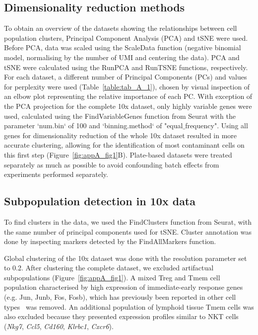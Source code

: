 \subsection{Dimensionality reduction methods}
To obtain an overview of the datasets showing the relationships between cell population clusters, Principal Component Analysis (PCA) and tSNE were used. Before PCA, data was scaled using the ScaleData function (negative binomial model, normalising by the number of UMI and centering the data). PCA and tSNE were calculated using the RunPCA and RunTSNE functions, respectively. For each dataset, a different number of Principal Components (PCs) and values for perplexity were used (Table~\ref{table:tab_A_1}), chosen by visual inspection of an elbow plot representing the relative importance of each PC. With exception of the PCA projection for the complete 10x dataset, only highly variable genes were used, calculated using the FindVariableGenes function from Seurat with the parameter `num.bin` of 100 and `binning.method` of "equal${\_}$frequency". Using all genes for dimensionality reduction of the whole 10x dataset resulted in more accurate clustering, allowing for the identification of most contaminant cells on this first step (Figure~\ref{fig:appA_fig1}B). Plate-based datasets were treated separately as much as possible to avoid confounding batch effects from experiments performed separately.


\subsection{Subpopulation detection in 10x data}
To find clusters in the data, we used the FindClusters function from Seurat, with the same number of principal components used for tSNE. Cluster annotation was done by inspecting markers detected by the FindAllMarkers function.

Global clustering of the 10x dataset was done with the resolution parameter set to 0.2. After clustering the complete dataset, we excluded artifactual subpopulations (Figure~\ref{fig:appA_fig1}). A mixed Treg and Tmem cell population characterised by high expression of immediate-early response genes (e.g. Jun, Junb, Fos, Fosb), which has previously been reported in other cell types~\citep{Adam2017-wd,Van_den_Brink2017-lg,Wu2017-jn} was removed. An additional population of lymphoid tissue Tmem cells was also excluded because they presented expression profiles similar to NKT cells (\textit{Nkg7}, \textit{Ccl5}, \textit{Cd160}, \textit{Klrbc1}, \textit{Cxcr6}).

